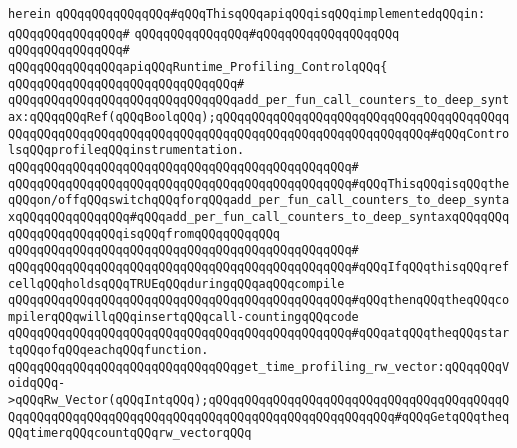 \verb|herein|\newline
\newline
\verb|qQQqqQQqqQQqqQQq#qQQqThisqQQqapiqQQqisqQQqimplementedqQQqin:|\newline
\verb|qQQqqQQqqQQqqQQq#|\newline
\verb|qQQqqQQqqQQqqQQq#qQQqqQQqqQQqqQQqqQQq|\newline
\verb|qQQqqQQqqQQqqQQq#|\newline
\verb|qQQqqQQqqQQqqQQqapiqQQqRuntime_Profiling_ControlqQQq{|\newline
\verb|qQQqqQQqqQQqqQQqqQQqqQQqqQQqqQQq#|\newline
\newline
\verb|qQQqqQQqqQQqqQQqqQQqqQQqqQQqqQQqadd_per_fun_call_counters_to_deep_syntax:qQQqqQQqRef(qQQqBoolqQQq);qQQqqQQqqQQqqQQqqQQqqQQqqQQqqQQqqQQqqQQqqQQqqQQqqQQqqQQqqQQqqQQqqQQqqQQqqQQqqQQqqQQqqQQqqQQqqQQqqQQq#qQQqControlsqQQqprofileqQQqinstrumentation.|\newline
\verb|qQQqqQQqqQQqqQQqqQQqqQQqqQQqqQQqqQQqqQQqqQQqqQQq#|\newline
\verb|qQQqqQQqqQQqqQQqqQQqqQQqqQQqqQQqqQQqqQQqqQQqqQQq#qQQqThisqQQqisqQQqtheqQQqon/offqQQqswitchqQQqforqQQqadd_per_fun_call_counters_to_deep_syntaxqQQqqQQqqQQqqQQq#qQQqadd_per_fun_call_counters_to_deep_syntaxqQQqqQQqqQQqqQQqqQQqqQQqisqQQqfromqQQqqQQqqQQq|\newline
\verb|qQQqqQQqqQQqqQQqqQQqqQQqqQQqqQQqqQQqqQQqqQQqqQQq#|\newline
\verb|qQQqqQQqqQQqqQQqqQQqqQQqqQQqqQQqqQQqqQQqqQQqqQQq#qQQqIfqQQqthisqQQqrefcellqQQqholdsqQQqTRUEqQQqduringqQQqaqQQqcompile|\newline
\verb|qQQqqQQqqQQqqQQqqQQqqQQqqQQqqQQqqQQqqQQqqQQqqQQq#qQQqthenqQQqtheqQQqcompilerqQQqwillqQQqinsertqQQqcall-countingqQQqcode|\newline
\verb|qQQqqQQqqQQqqQQqqQQqqQQqqQQqqQQqqQQqqQQqqQQqqQQq#qQQqatqQQqtheqQQqstartqQQqofqQQqeachqQQqfunction.|\newline
\newline
\verb|qQQqqQQqqQQqqQQqqQQqqQQqqQQqqQQqget_time_profiling_rw_vector:qQQqqQQqVoidqQQq->qQQqRw_Vector(qQQqIntqQQq);qQQqqQQqqQQqqQQqqQQqqQQqqQQqqQQqqQQqqQQqqQQqqQQqqQQqqQQqqQQqqQQqqQQqqQQqqQQqqQQqqQQqqQQqqQQqqQQq#qQQqGetqQQqtheqQQqtimerqQQqcountqQQqrw_vectorqQQq|\newline
